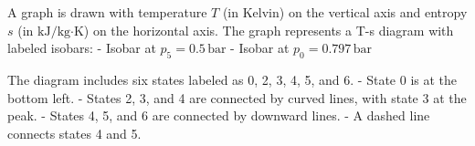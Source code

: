 A graph is drawn with temperature \( T \) (in Kelvin) on the vertical axis and entropy \( s \) (in \( \text{kJ}/\text{kg·K} \)) on the horizontal axis. The graph represents a T-s diagram with labeled isobars:  
- Isobar at \( p_5 = 0.5 \, \text{bar} \)  
- Isobar at \( p_0 = 0.797 \, \text{bar} \)  

The diagram includes six states labeled as 0, 2, 3, 4, 5, and 6.  
- State 0 is at the bottom left.  
- States 2, 3, and 4 are connected by curved lines, with state 3 at the peak.  
- States 4, 5, and 6 are connected by downward lines.  
- A dashed line connects states 4 and 5.